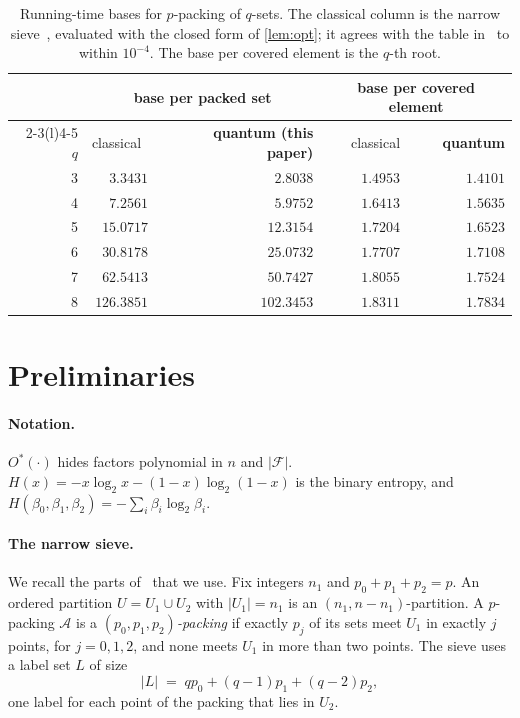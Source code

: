 \documentclass[11pt,a4paper]{article}
\theoremstyle{plain}
\theoremstyle{remark}
\newcommand{\Ostar}{O^{*}}
\newcommand{\F}{\mathcal{F}}
\newcommand{\A}{\mathcal{A}}
\begin{document}
\begin{table}[t]
\centering
\small
\begin{tabular}{@{}rrrrr@{}}
\toprule
 & \multicolumn{2}{c}{base per packed set} & \multicolumn{2}{c}{base per covered element} \\
\cmidrule(lr){2-3}\cmidrule(l){4-5}
$q$ & classical~\cite{bhkk} & \textbf{quantum (this paper)} & classical & \textbf{quantum} \\
\midrule
3 & $3.3431$ & $\mathbf{2.8038}$ & $1.4953$ & $\mathbf{1.4101}$ \\
4 & $7.2561$ & $\mathbf{5.9752}$ & $1.6413$ & $\mathbf{1.5635}$ \\
5 & $15.0717$ & $\mathbf{12.3154}$ & $1.7204$ & $\mathbf{1.6523}$ \\
6 & $30.8178$ & $\mathbf{25.0732}$ & $1.7707$ & $\mathbf{1.7108}$ \\
7 & $62.5413$ & $\mathbf{50.7427}$ & $1.8055$ & $\mathbf{1.7524}$ \\
8 & $126.3851$ & $\mathbf{102.3453}$ & $1.8311$ & $\mathbf{1.7834}$ \\
\bottomrule
\end{tabular}
\caption{Running-time bases for $p$-packing of $q$-sets. The classical column is the narrow sieve~\cite{bhkk}, evaluated with the closed form of \cref{lem:opt}; it agrees with the table in~\cite{bhkk} to within $10^{-4}$. The base per covered element is the $q$-th root.}
\label{tab:bases}
\end{table}

\section{Preliminaries}\label{sec:prelim}

\paragraph{Notation.}
$\Ostar(\cdot)$ hides factors polynomial in $n$ and $|\F|$. $H(x) = -x\log_2 x - (1-x)\log_2(1-x)$ is the binary entropy, and $H(\beta_0,\beta_1,\beta_2) = -\sum_i \beta_i\log_2\beta_i$.

\paragraph{The narrow sieve.}
We recall the parts of~\cite[\S 4]{bhkk} that we use. Fix integers $n_1$ and $p_0+p_1+p_2 = p$. An ordered partition $U = U_1 \cup U_2$ with $|U_1| = n_1$ is an $(n_1,n-n_1)$-partition. A $p$-packing $\A$ is a \emph{$(p_0,p_1,p_2)$-packing} if exactly $p_j$ of its sets meet $U_1$ in exactly $j$ points, for $j = 0,1,2$, and none meets $U_1$ in more than two points. The sieve uses a label set $L$ of size
\[
  |L| \;=\; q p_0 + (q-1)p_1 + (q-2)p_2 ,
\]
one label for each point of the packing that lies in $U_2$.
\end{document}
